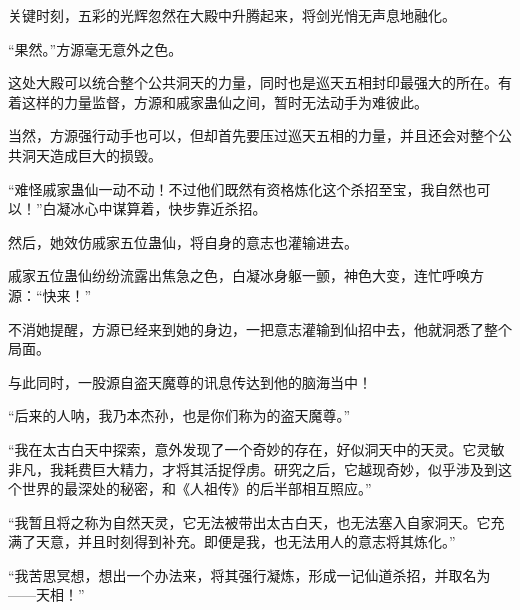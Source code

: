 \begin{this_body}
关键时刻，五彩的光辉忽然在大殿中升腾起来，将剑光悄无声息地融化。

“果然。”方源毫无意外之色。

这处大殿可以统合整个公共洞天的力量，同时也是巡天五相封印最强大的所在。有着这样的力量监督，方源和戚家蛊仙之间，暂时无法动手为难彼此。

当然，方源强行动手也可以，但却首先要压过巡天五相的力量，并且还会对整个公共洞天造成巨大的损毁。

“难怪戚家蛊仙一动不动！不过他们既然有资格炼化这个杀招至宝，我自然也可以！”白凝冰心中谋算着，快步靠近杀招。

然后，她效仿戚家五位蛊仙，将自身的意志也灌输进去。

戚家五位蛊仙纷纷流露出焦急之色，白凝冰身躯一颤，神色大变，连忙呼唤方源：“快来！”

不消她提醒，方源已经来到她的身边，一把意志灌输到仙招中去，他就洞悉了整个局面。

与此同时，一股源自盗天魔尊的讯息传达到他的脑海当中！

“后来的人呐，我乃本杰孙，也是你们称为的盗天魔尊。”

“我在太古白天中探索，意外发现了一个奇妙的存在，好似洞天中的天灵。它灵敏非凡，我耗费巨大精力，才将其活捉俘虏。研究之后，它越现奇妙，似乎涉及到这个世界的最深处的秘密，和《人祖传》的后半部相互照应。”

“我暂且将之称为自然天灵，它无法被带出太古白天，也无法塞入自家洞天。它充满了天意，并且时刻得到补充。即便是我，也无法用人的意志将其炼化。”

“我苦思冥想，想出一个办法来，将其强行凝炼，形成一记仙道杀招，并取名为——天相！”

\end{this_body}

